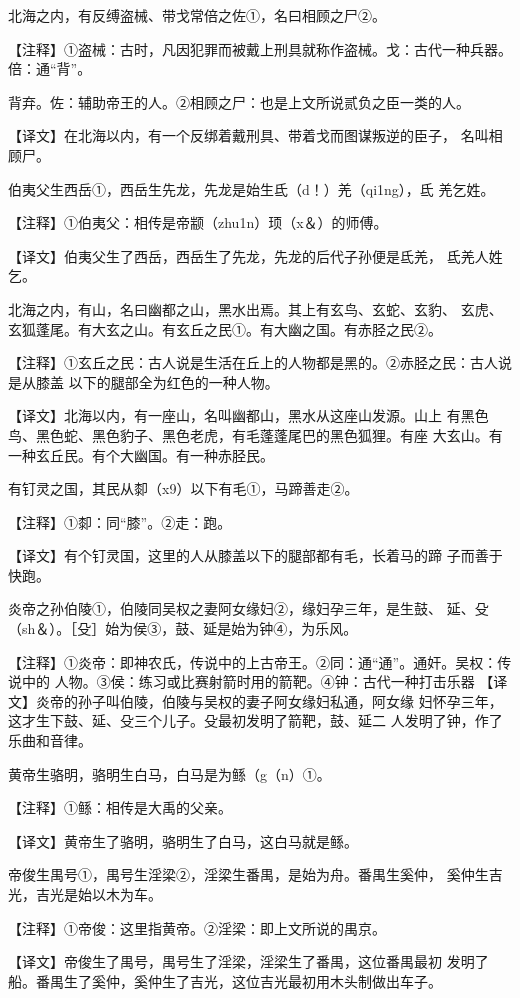 \documentclass[a4paper,12pt,UTF8,twoside]{ctexbook}
\begin{document}
北海之内，有反缚盗械、带戈常倍之佐①，名曰相顾之尸②。

【注释】①盗械：古时，凡因犯罪而被戴上刑具就称作盗械。戈：古代一种兵器。倍：通“背”。

背弃。佐：辅助帝王的人。②相顾之尸：也是上文所说贰负之臣一类的人。

【译文】在北海以内，有一个反绑着戴刑具、带着戈而图谋叛逆的臣子， 名叫相顾尸。

伯夷父生西岳①，西岳生先龙，先龙是始生氐（d！）羌（qi1ng），氐 羌乞姓。

【注释】①伯夷父：相传是帝颛（zhu1n）顼（x＆）的师傅。

【译文】伯夷父生了西岳，西岳生了先龙，先龙的后代子孙便是氐羌， 氐羌人姓乞。

北海之内，有山，名曰幽都之山，黑水出焉。其上有玄鸟、玄蛇、玄豹、 玄虎、玄狐蓬尾。有大玄之山。有玄丘之民①。有大幽之国。有赤胫之民②。

【注释】①玄丘之民：古人说是生活在丘上的人物都是黑的。②赤胫之民：古人说是从膝盖 以下的腿部全为红色的一种人物。

【译文】北海以内，有一座山，名叫幽都山，黑水从这座山发源。山上 有黑色鸟、黑色蛇、黑色豹子、黑色老虎，有毛蓬蓬尾巴的黑色狐狸。有座 大玄山。有一种玄丘民。有个大幽国。有一种赤胫民。

有钉灵之国，其民从厀（x9）以下有毛①，马蹄善走②。

【注释】①厀：同“膝”。②走：跑。

【译文】有个钉灵国，这里的人从膝盖以下的腿部都有毛，长着马的蹄 子而善于快跑。

炎帝之孙伯陵①，伯陵同吴权之妻阿女缘妇②，缘妇孕三年，是生鼓、 延、殳（sh＆）。［殳］始为侯③，鼓、延是始为钟④，为乐风。

【注释】①炎帝：即神农氏，传说中的上古帝王。②同：通“通”。通奸。吴权：传说中的 人物。③侯：练习或比赛射箭时用的箭靶。④钟：古代一种打击乐器 【译文】炎帝的孙子叫伯陵，伯陵与吴权的妻子阿女缘妇私通，阿女缘 妇怀孕三年，这才生下鼓、延、殳三个儿子。殳最初发明了箭靶，鼓、延二 人发明了钟，作了乐曲和音律。

黄帝生骆明，骆明生白马，白马是为鲧（g（n）①。

【注释】①鲧：相传是大禹的父亲。

【译文】黄帝生了骆明，骆明生了白马，这白马就是鲧。

帝俊生禺号①，禺号生淫梁②，淫梁生番禺，是始为舟。番禺生奚仲， 奚仲生吉光，吉光是始以木为车。

【注释】①帝俊：这里指黄帝。②淫梁：即上文所说的禺京。

【译文】帝俊生了禺号，禺号生了淫梁，淫梁生了番禺，这位番禺最初 发明了船。番禺生了奚仲，奚仲生了吉光，这位吉光最初用木头制做出车子。
\end{document}
